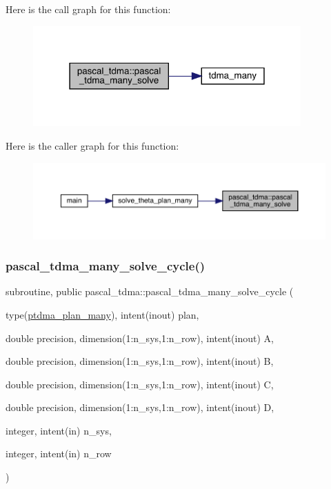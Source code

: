 Here is the call graph for this function\+:
\nopagebreak
\begin{figure}[H]
\begin{center}
\leavevmode
\includegraphics[width=291pt]{namespacepascal__tdma_afa0c78b8377f5fe1059907befda3c940_cgraph}
\end{center}
\end{figure}
Here is the caller graph for this function\+:
\nopagebreak
\begin{figure}[H]
\begin{center}
\leavevmode
\includegraphics[width=350pt]{namespacepascal__tdma_afa0c78b8377f5fe1059907befda3c940_icgraph}
\end{center}
\end{figure}
\mbox{\label{namespacepascal__tdma_acbaed65e67ecbfd92a8f1d51d1b69fd5}} 
\subsubsection{\texorpdfstring{pascal\_tdma\_many\_solve\_cycle()}{pascal\_tdma\_many\_solve\_cycle()}}
{\footnotesize\ttfamily subroutine, public pascal\+\_\+tdma\+::pascal\+\_\+tdma\+\_\+many\+\_\+solve\+\_\+cycle (\begin{DoxyParamCaption}\item[{type(\mbox{\hyperlink{structpascal__tdma_1_1ptdma__plan__many}{ptdma\+\_\+plan\+\_\+many}}), intent(inout)}]{plan,  }\item[{double precision, dimension(1\+:n\+\_\+sys,1\+:n\+\_\+row), intent(inout)}]{A,  }\item[{double precision, dimension(1\+:n\+\_\+sys,1\+:n\+\_\+row), intent(inout)}]{B,  }\item[{double precision, dimension(1\+:n\+\_\+sys,1\+:n\+\_\+row), intent(inout)}]{C,  }\item[{double precision, dimension(1\+:n\+\_\+sys,1\+:n\+\_\+row), intent(inout)}]{D,  }\item[{integer, intent(in)}]{n\+\_\+sys,  }\item[{integer, intent(in)}]{n\+\_\+row }\end{DoxyParamCaption})}



